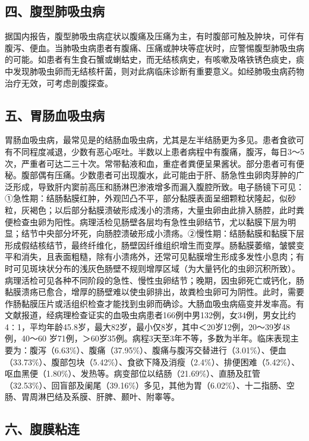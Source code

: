 \subsection{四、腹型肺吸虫病}

据国内报告，腹型肺吸虫病症状以腹痛及压痛为主，有时腹部可触及肿块，可伴有腹泻、便血。当肺吸虫病患者有腹痛、压痛或肿块等症状时，应警惕腹型肺吸虫病的可能。如患者有生食石蟹或蝲蛄史，而无结核病史，有咳嗽及咯铁锈色痰史，痰中发现肺吸虫卵而无结核杆菌，则对此病临床诊断有重要意义。如经肺吸虫病药物治疗无效，可考虑剖腹探查。

\subsection{五、胃肠血吸虫病}

胃肠血吸虫病，最常见是的结肠血吸虫病，尤其是左半结肠更为多见。患者食欲可有不同程度减退，少数有恶心呕吐。半数以上患者病程中有腹痛，腹泻，每日3～5次，严重者可达二三十次。常带黏液和血，重症者粪便呈果酱状。部分患者可有便秘。腹部偶有压痛。少数患者可出现腹水，此可能由于肝、肠急性虫卵肉芽肿的广泛形成，导致肝内窦前高压和肠淋巴渗液增多而漏入腹腔所致。电子肠镜下可见：①急性期：结肠黏膜红肿，外观凹凸不平，部分黏膜表面呈细颗粒状隆起，似砂粒，灰褐色；以后部分黏膜溃破形成浅小的溃疡，大量虫卵由此排入肠腔，此时粪便检查虫卵为阳性。病理活检见肠壁各层均有急性虫卵结节，尤以黏膜下层为明显；结节中央部分坏死，向肠腔溃破形成小溃疡。②慢性期：结肠黏膜和黏膜下层形成假结核结节，最终纤维化，肠壁因纤维组织增生而变厚。肠黏膜萎缩，皱襞变平和消失，且表面粗糙，除有小溃疡外，还常可见黏膜增生形成多发性小息肉；有时可见斑块状分布的浅灰色肠壁不规则增厚区域（为大量钙化的虫卵沉积所致）。病理活检可见各种不同阶段的急性、慢性虫卵结节；晚期，因虫卵死亡或钙化，肠黏膜溃疡已愈合，增厚的肠壁难以使虫卵排出，故粪检虫卵可为阴性。此时，需要作肠黏膜压片或活组织检查才能找到虫卵而确诊。大肠血吸虫病癌变并发率高。有文献报道，经病理检查证实的血吸虫病患者166例中男132例，女34例，男女比约4∶1，平均年龄45.8岁，最大82岁，最小仅8岁，其中＜20岁12例，20～39岁48例，40～60
岁71例，＞60岁35例。病程3天至3年不等，多数为半年。临床表现主要为：腹泻（6.63\%）、腹痛（37.95\%）、腹痛与腹泻交替进行（3.01\%）、便血（33.73\%）、腹部包块（5.42\%）、食欲下降及消瘦（2.4\%）、排便困难（5.42\%）、呕血黑便（1.80\%）、发热等。病变部位以结肠（21.69\%）、直肠及肛管（32.53\%）、回盲部及阑尾（39.16\%）多见，其他为胃（6.02\%）、十二指肠、空肠、胃周淋巴结及系膜、肝脾、颞叶、附睾等。

\subsection{六、腹膜粘连}

